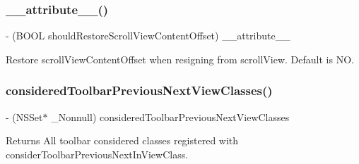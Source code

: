 \subsubsection{\texorpdfstring{\+\_\+\+\_\+attribute\+\_\+\+\_\+()}{\_\_attribute\_\_()}\hspace{0.1cm}{\footnotesize\ttfamily [3/3]}}
{\footnotesize\ttfamily -\/ (B\+O\+OL should\+Restore\+Scroll\+View\+Content\+Offset) \+\_\+\+\_\+attribute\+\_\+\+\_\+ \begin{DoxyParamCaption}\item[{((deprecated(\char`\"{}Please use I\+Q\+U\+I\+Scroll\+View+Additions category instead. This property will be removed from here in future release.\char`\"{})))}]{ }\end{DoxyParamCaption}}

Restore scroll\+View\+Content\+Offset when resigning from scroll\+View. Default is NO. \mbox{\label{interface_i_q_keyboard_manager_a53372abfa157904c7e17dd8b5b544b09}} 
\subsubsection{\texorpdfstring{considered\+Toolbar\+Previous\+Next\+View\+Classes()}{consideredToolbarPreviousNextViewClasses()}\hspace{0.1cm}{\footnotesize\ttfamily [1/3]}}
{\footnotesize\ttfamily -\/ (N\+S\+Set$\ast$ \+\_\+\+Nonnull) considered\+Toolbar\+Previous\+Next\+View\+Classes \begin{DoxyParamCaption}{ }\end{DoxyParamCaption}}

Returns All toolbar considered classes registered with consider\+Toolbar\+Previous\+Next\+In\+View\+Class. \mbox{\label{interface_i_q_keyboard_manager_a0a6fb3f3af6ffad0452480bbfc775c35}} 
